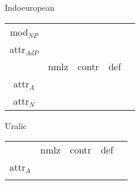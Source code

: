 {\begin{figure}[htbp]
\parbox[b]{0.5\textwidth}{
\begin{center}{\sc Indoeuropean}\\
\medskip
\begin{tabular}{| c || c | c | c | c}
\cline{1-1}
{\sc mod}$_{NP}$\\
\cline{1-1}
{\sc attr}$_{AdP}$\\
\hline
 & {\sc nmlz} & {\sc contr} & {\sc def}\\
\hline
{\sc attr}$_{A}$\\
\cline{1-1}
{\sc attr}$_{N}$\\
\cline{1-1}
\end{tabular}
\end{center}
}
\parbox[b]{0.5\textwidth}{
\begin{center}{\sc Uralic}\\
\medskip
\begin{tabular}{| c || c | c | c | c}
\cline{1-1}
\\
\cline{1-1}
\\
\hline
 & {\sc nmlz} & {\sc contr} & {\sc def}\\
\hline
{\sc attr}$_{A}$\\
\cline{1-1}
\\
\cline{1-1}
\end{tabular}
\end{center}
}


\end{figure}}
